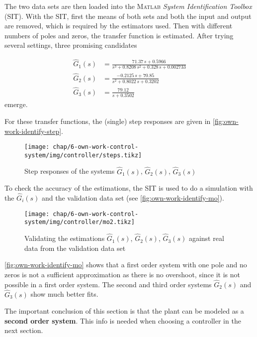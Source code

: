 The two data sets are then loaded into the \textsc{Matlab} \textit{System Identification Toolbox} (SIT). With the SIT, first the means of both sets and both the input and output are removed, which is required by the estimators used. Then with different numbers of poles and zeros, the transfer function is estimated. After trying several settings, three promising candidates

\begin{align}
\hat{G}_1(s) &= \frac{71.37\,s + 0.5966}{s^3 + 0.8208\,s^2 + 0.328\,s + 0.002733} \\[1em]
\hat{G}_2(s) &= \frac{-0.2125\,s + 70.85}{s^2 + 0.8022\,s + 0.3202} \\[1em]
\hat{G}_3(s) &= \frac{79.12}{s + 0.3502}
\end{align}
emerge.

For these transfer functions, the (single) step responses are given in \autoref{fig:own-work-identify-step}.

\begin{figure}[tb]
	\centering
	\texttt{[image: chap/6-own-work-control-system/img/controller/steps.tikz]}
	\caption{Step responses of the systems $\hat{G}_1(s)$, $\hat{G}_2(s)$, $\hat{G}_3(s)$}
	\label{fig:own-work-identify-step}
\end{figure}

To check the accuracy of the estimations, the SIT is used to do a simulation with the $\hat{G}_i(s)$ and the validation data set (see \autoref{fig:own-work-identify-mo}).

\begin{figure}[tb]
	\centering
	\texttt{[image: chap/6-own-work-control-system/img/controller/mo2.tikz]}
	\caption{Validating the estimations $\hat{G}_1(s)$, $\hat{G}_2(s)$, $\hat{G}_3(s)$ against real data from the validation data set}
	\label{fig:own-work-identify-mo}
\end{figure}

\autoref{fig:own-work-identify-mo} shows that a first order system with one pole and no zeros is not a sufficient approximation as there is no overshoot, since it is not possible in a first order system. The second and third order systems $\hat{G}_2(s)$ and $\hat{G}_3(s)$ show much better fits.

The important conclusion of this section is that the plant can be modeled as a \textbf{second order system}. This info is needed when choosing a controller in the next section.

